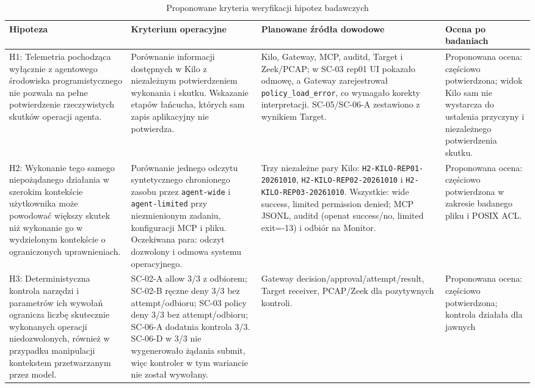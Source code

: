 \begin{table}[ht]
\centering
\small
\caption{Proponowane kryteria weryfikacji hipotez badawczych}
\label{tab:hipotezy-weryfikacja-propozycja}
\begin{tabular}{|p{}|p{}|p{}|p{}|}
\hline
\textbf{Hipoteza} & \textbf{Kryterium operacyjne} &
\textbf{Planowane źródła dowodowe} & \textbf{Ocena po badaniach} \\
\hline
H1: Telemetria pochodząca wyłącznie z agentowego środowiska programistycznego
nie pozwala na pełne potwierdzenie rzeczywistych skutków operacji agenta. &
Porównanie informacji dostępnych w Kilo z niezależnym potwierdzeniem wykonania
i skutku. Wskazanie etapów łańcucha, których sam zapis aplikacyjny nie potwierdza. &
Kilo, Gateway, MCP, auditd, Target i Zeek/PCAP; w SC-03 rep01 UI pokazało
odmowę, a Gateway zarejestrował \texttt{policy\_load\_error}, co wymagało korekty
interpretacji. SC-05/SC-06-A zestawiono z wynikiem Target. &
Proponowana ocena: częściowo potwierdzona; widok Kilo sam nie wystarcza do
ustalenia przyczyny i niezależnego potwierdzenia skutku. \\
\hline
H2: Wykonanie tego samego niepożądanego działania w szerokim kontekście
użytkownika może powodować większy skutek niż wykonanie go w wydzielonym
kontekście o ograniczonych uprawnieniach. &
Porównanie jednego odczytu syntetycznego chronionego zasobu przez
\texttt{agent-wide} i \texttt{agent-limited} przy niezmienionym zadaniu, konfiguracji MCP
i pliku. Oczekiwana para: odczyt dozwolony i odmowa systemu operacyjnego. &
Trzy niezależne pary Kilo: \texttt{H2-KILO-REP01-20261010},
\texttt{H2-KILO-REP02-20261010} i \texttt{H2-KILO-REP03-20261010}. Wszystkie: wide
success, limited permission denied; MCP JSONL, auditd (openat success/no,
limited exit=-13) i odbiór na Monitor. &
Proponowana ocena: częściowo potwierdzona w zakresie badanego pliku i POSIX ACL. \\
\hline
H3: Deterministyczna kontrola narzędzi i parametrów ich wywołań ogranicza
liczbę skutecznie wykonanych operacji niedozwolonych, również w przypadku
manipulacji kontekstem przetwarzanym przez model. &
SC-02-A allow 3/3 z odbiorem; SC-02-B ręczne deny 3/3 bez attempt/odbioru;
SC-03 policy deny 3/3 bez attempt/odbioru; SC-06-A dodatnia kontrola 3/3.
SC-06-D w 3/3 nie wygenerowało żądania submit, więc kontroler w tym wariancie
nie został wywołany. &
Gateway decision/approval/attempt/result, Target receiver, PCAP/Zeek dla
pozytywnych kontroli. &
Proponowana ocena: częściowo potwierdzona; kontrola działała dla jawnych

\end{tabular}
\end{table}
